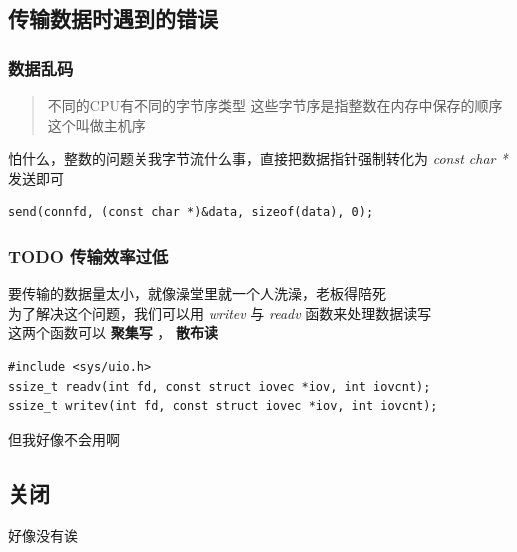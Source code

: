 \documentclass[11pt]{article}
\begin{document}
\subsection{传输数据时遇到的错误}
\label{sec:orgb44ba17}
\subsubsection{数据乱码}
\label{sec:org7b1c549}
\begin{quote}
不同的CPU有不同的字节序类型 这些字节序是指整数在内存中保存的顺序 这个叫做主机序\\
\end{quote}

怕什么，整数的问题关我字节流什么事，直接把数据指针强制转化为 \emph{const char *} 发送即可\\
\begin{verbatim}
send(connfd, (const char *)&data, sizeof(data), 0);
\end{verbatim}
\subsubsection{{\bfseries\sffamily TODO} 传输效率过低}
\label{sec:org3d4d8e6}
要传输的数据量太小，就像澡堂里就一个人洗澡，老板得陪死\\
为了解决这个问题，我们可以用 \emph{writev} 与 \emph{readv} 函数来处理数据读写\\
这两个函数可以 \textbf{聚集写} ， \textbf{散布读}\\
\begin{verbatim}
#include <sys/uio.h>
ssize_t readv(int fd, const struct iovec *iov, int iovcnt);
ssize_t writev(int fd, const struct iovec *iov, int iovcnt);
\end{verbatim}
但我好像不会用啊\\
\subsection{关闭}
\label{sec:org5d4cf12}
好像没有诶\\
\end{document}
